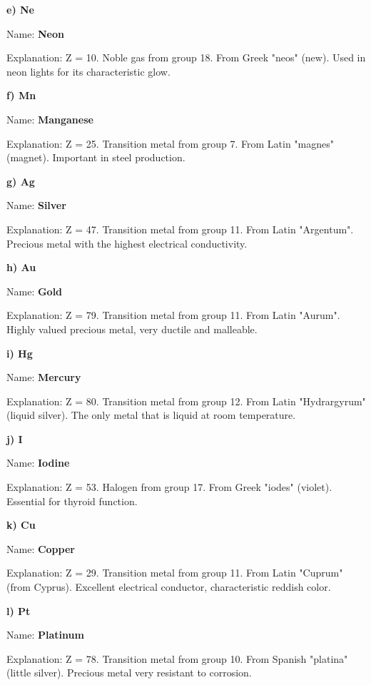 \begin{exercise}
\begin{solu}
        \textbf{e) Ne}

        Name: \textbf{Neon}

        Explanation: Z = 10. Noble gas from group 18. From Greek "neos" (new). Used in neon lights for its characteristic glow.

        \textbf{f) Mn}

        Name: \textbf{Manganese}

        Explanation: Z = 25. Transition metal from group 7. From Latin "magnes" (magnet). Important in steel production.

        \textbf{g) Ag}

        Name: \textbf{Silver}

        Explanation: Z = 47. Transition metal from group 11. From Latin "Argentum". Precious metal with the highest electrical conductivity.

        \textbf{h) Au}

        Name: \textbf{Gold}

        Explanation: Z = 79. Transition metal from group 11. From Latin "Aurum". Highly valued precious metal, very ductile and malleable.

        \textbf{i) Hg}

        Name: \textbf{Mercury}

        Explanation: Z = 80. Transition metal from group 12. From Latin "Hydrargyrum" (liquid silver). The only metal that is liquid at room temperature.

        \textbf{j) I}

        Name: \textbf{Iodine}

        Explanation: Z = 53. Halogen from group 17. From Greek "iodes" (violet). Essential for thyroid function.

        \textbf{k) Cu}

        Name: \textbf{Copper}

        Explanation: Z = 29. Transition metal from group 11. From Latin "Cuprum" (from Cyprus). Excellent electrical conductor, characteristic reddish color.

        \textbf{l) Pt}

        Name: \textbf{Platinum}

        Explanation: Z = 78. Transition metal from group 10. From Spanish "platina" (little silver). Precious metal very resistant to corrosion.


\end{solu}
\end{exercise}
